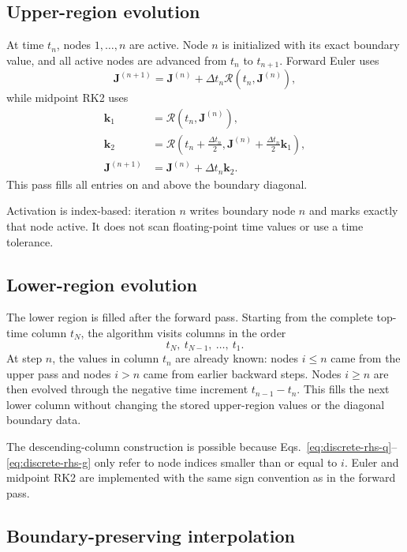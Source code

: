 \documentclass[11pt]{article}
\newcommand{\Jvec}{\bm J}
\newcommand{\Rvec}{\bm{\mathcal R}}
\begin{document}
\subsection{Upper-region evolution}

At time \(t_n\), nodes \(1,\ldots,n\) are active. Node \(n\) is initialized
with its exact boundary value, and all active nodes are advanced from \(t_n\)
to \(t_{n+1}\). Forward Euler uses
\begin{equation}
  \Jvec^{(n+1)}
  =
  \Jvec^{(n)}+\Delta t_n\Rvec(t_n,\Jvec^{(n)}),
  \label{eq:euler}
\end{equation}
while midpoint RK2 uses
\begin{align}
  \bm k_1&=\Rvec(t_n,\Jvec^{(n)}),\\
  \bm k_2&=\Rvec\left(
    t_n+\frac{\Delta t_n}{2},
    \Jvec^{(n)}+\frac{\Delta t_n}{2}\bm k_1
  \right),\\
  \Jvec^{(n+1)}
  &=\Jvec^{(n)}+\Delta t_n\bm k_2.
  \label{eq:rk2}
\end{align}
This pass fills all entries on and above the boundary diagonal.

Activation is index-based: iteration \(n\) writes boundary node \(n\) and
marks exactly that node active. It does not scan floating-point time values or
use a time tolerance.

\subsection{Lower-region evolution}

The lower region is filled after the forward pass. Starting from the complete
top-time column \(t_N\), the algorithm visits columns in the order
\[
  t_N,\ t_{N-1},\ \ldots,\ t_1.
\]
At step \(n\), the values in column \(t_n\) are already known: nodes
\(i\le n\) came from the upper pass and nodes \(i>n\) came from earlier
backward steps. Nodes \(i\ge n\) are then evolved through the negative time
increment \(t_{n-1}-t_n\). This fills the next lower column without changing
the stored upper-region values or the diagonal boundary data.

The descending-column construction is possible because
Eqs.~\eqref{eq:discrete-rhs-q}--\eqref{eq:discrete-rhs-g} only refer to node
indices smaller than or equal to \(i\). Euler and midpoint RK2 are implemented
with the same sign convention as in the forward pass.

\subsection{Boundary-preserving interpolation}
\end{document}
